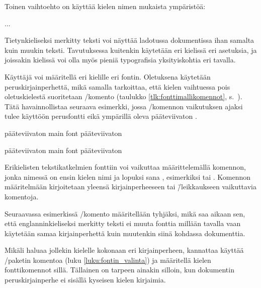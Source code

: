 Toinen vaihtoehto on käyttää kielen nimen mukaista ympäristöä:

\begin{koodilohkosis}
  \begin{greek}
    ...
  \end{greek}
\end{koodilohkosis}

Tietynkieliseksi merkitty teksti voi näyttää ladotussa dokumentissa ihan
samalta kuin muukin teksti. Tavutuksessa kuitenkin käytetään eri
kielissä eri asetuksia, ja joissakin kielissä voi olla myös pieniä
typografisia yksityiskohtia eri tavalla.

Käyttäjä voi määritellä eri kielille eri fontin. Oletuksena käytetään
peruskirjainperhettä, mikä samalla tarkoittaa, että kielen vaihtuessa
pois oletuskielestä suoritetaan \-/komento
(taulukko \ref{tlk:fonttimallikomennot},
s.~\pageref{tlk:fonttimallikomennot}). Tätä havainnollistaa seuraava
esimerkki, jossa \-/komennon vaikutuksen
ajaksi tulee käyttöön perusfontti  eikä ympärillä
oleva pääteviivaton .

\begin{koodilohkosis}
  \sffamily
  pääteviivaton \textenglish{main font} pääteviivaton
\end{koodilohkosis}

\begin{tulossis}
  \sffamily pääteviivaton {\rmfamily main font} pääteviivaton
\end{tulossis}

Erikielisten tekstikatkelmien fonttiin voi vaikuttaa määrittelemällä
komennon, jonka nimessä on ensin kielen nimi ja lopuksi sana
, esimerkiksi  tai . Komennon määritelmään kirjoitetaan yleensä
kirjainperheeseen tai \=/leikkaukseen vaikuttavia komentoja.

Seuraavassa esimerkissä \-/komento
määritellään tyhjäksi, mikä saa aikaan sen, että englanninkieliseksi
merkitty teksti ei muuta fonttia millään tavalla vaan käytetään samaa
kirjainperhettä kuin muutenkin siinä kohdassa dokumenttia.

\begin{koodilohkosis}
  \newcommand{\englishfont}{}
\end{koodilohkosis}

Mikäli haluaa jollekin kielelle kokonaan eri kirjainperheen, kannattaa
käyttää \-/paketin komentoa  (luku \ref{luku:fontin_valinta}) ja määritellä
kielen fonttikomennot sillä. Tällainen on tarpeen ainakin silloin, kun
dokumentin peruskirjainperhe ei sisällä kyseisen kielen kirjaimia.

